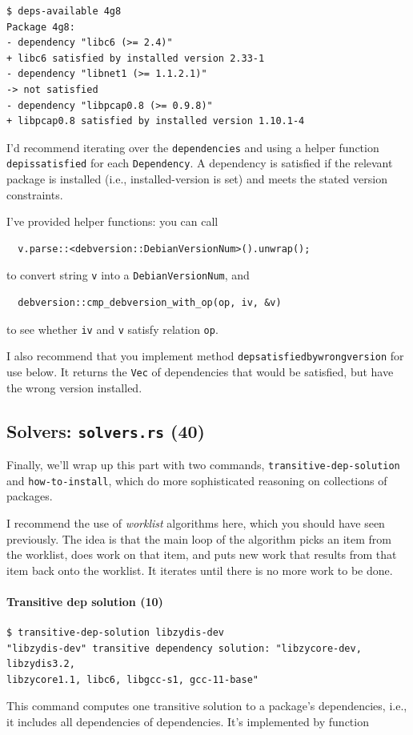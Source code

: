 \documentclass[12pt]{article}
\renewcommand{\_}{\kern-1.5pt\textunderscore\kern-1.5pt}
\begin{document}
\begin{verbatim}
$ deps-available 4g8
Package 4g8:
- dependency "libc6 (>= 2.4)"
+ libc6 satisfied by installed version 2.33-1
- dependency "libnet1 (>= 1.1.2.1)"
-> not satisfied
- dependency "libpcap0.8 (>= 0.9.8)"
+ libpcap0.8 satisfied by installed version 1.10.1-4
\end{verbatim}
I'd recommend iterating over the \texttt{dependencies} and using a helper function \texttt{dep\_is\_satisfied}
for each \texttt{Dependency}. A dependency is satisfied if the relevant package is installed (i.e., installed-version
is set) and meets the stated version constraints. 

\vspace{1em}
I've provided helper functions: you can call 
\begin{verbatim}
  v.parse::<debversion::DebianVersionNum>().unwrap();
\end{verbatim}
to convert string \texttt{v} into a \texttt{DebianVersionNum}, and 
\begin{verbatim}
  debversion::cmp_debversion_with_op(op, iv, &v)
\end{verbatim}
to see whether \texttt{iv} and \texttt{v} satisfy relation \texttt{op}.

\vspace{1em}
I also recommend that you implement method \texttt{dep\_satisfied\_by\_wrong\_version} for use below.
It returns the \texttt{Vec} of dependencies that would be satisfied, but have the wrong version installed.

\subsection*{Solvers: \texttt{solvers.rs} (40)}

Finally, we'll wrap up this part with two commands, \texttt{transitive-dep-solution} and \texttt{how-to-install},
which do more sophisticated reasoning on collections of packages.

\vspace{1em}
I recommend the use of \emph{worklist} algorithms here, which you should have seen previously.
The idea is that the main loop of the algorithm picks an item from the worklist, does work on that
item, and puts new work that results from that item back onto the worklist. It iterates until there
is no more work to be done.

\paragraph{Transitive dep solution (10)}
\begin{verbatim}
$ transitive-dep-solution libzydis-dev
"libzydis-dev" transitive dependency solution: "libzycore-dev, libzydis3.2, 
libzycore1.1, libc6, libgcc-s1, gcc-11-base"
\end{verbatim}
This command computes one transitive solution to a package's dependencies, i.e., it includes all 
dependencies of dependencies. It's implemented by function 
\end{document}
